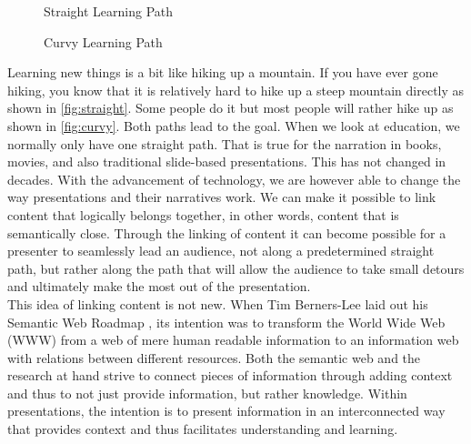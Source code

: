 \documentclass[twoside, 12pt]{article}
\begin{document}
\begin{figure}
\vspace{-28pt}
  \begin{center}
\vspace{-20pt}
  \caption{Straight Learning Path}
  \label{fig:straight}
\vspace{5pt}  

  \end{center}
\vspace{-20pt}
  \caption{Curvy Learning Path}
  \label{fig:curvy}
\vspace{-10pt}
\end{figure}

Learning new things is a bit like hiking up a mountain. If you have ever gone hiking, you know that it is relatively hard to hike up a steep mountain directly as shown in \autoref{fig:straight}. Some people do it but most people will rather hike up as shown in \autoref{fig:curvy}. Both paths lead to the goal. When we look at education, we normally only have one straight path. That is true for the narration in books, movies, and also traditional slide-based presentations. This has not changed in decades. With the advancement of technology, we are however able to change the way presentations and their narratives work. We can make it possible to link content that logically belongs together, in other words, content that is semantically close. Through the linking of content it can become possible for a presenter to seamlessly lead an audience, not along a predetermined straight path, but rather along the path that will allow the audience to take small detours and ultimately make the most out of the presentation.\\

This idea of linking content is not new. When Tim Berners-Lee laid out his Semantic Web Roadmap \cite{BernersLee:tsw98}, its intention was to transform the World Wide Web (WWW) from a web of mere human readable information to an information web with relations between different resources. Both the semantic web and the research at hand strive to connect pieces of information through adding context and thus to not just provide information, but rather knowledge. Within presentations, the intention is to present information in an interconnected way that provides context and thus facilitates understanding and learning.\\
\end{document}
